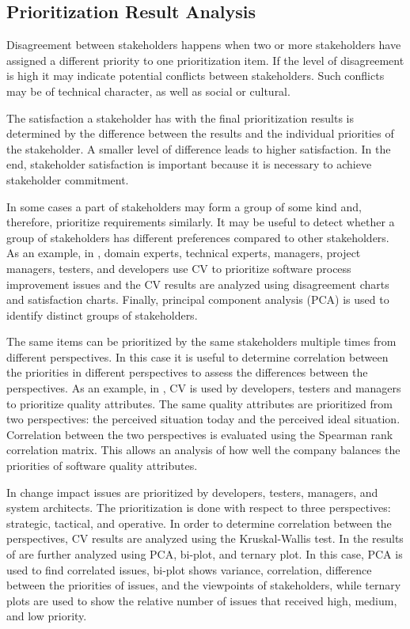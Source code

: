 \subsection{Prioritization Result Analysis}

Disagreement between stakeholders happens when two or more stakeholders have assigned
a different priority to one prioritization item. If the level of disagreement
is high it may indicate potential conflicts between stakeholders.
Such conflicts may be of technical character, as well as social or cultural.

The satisfaction a stakeholder has with the final prioritization results is
determined by the difference between the results and the individual priorities
of the stakeholder. A smaller level of difference leads to higher satisfaction.
In the end, stakeholder satisfaction is important because it is necessary to achieve
stakeholder commitment.

In some cases a part of stakeholders may form a group of some kind and, therefore, prioritize
requirements similarly. It may be useful
to detect whether a group of stakeholders has different preferences
compared to other stakeholders. As an example, in \cite{Pettersson2008}, domain experts,
technical experts, managers, project managers, testers, and developers
use CV to prioritize software process improvement issues and the CV results
are analyzed using disagreement charts and satisfaction charts.
Finally, principal component analysis (PCA) is used to identify distinct
groups of stakeholders.

The same items can be prioritized by the same stakeholders multiple times
from different perspectives. In this case it is useful to determine correlation between
the priorities in different perspectives to assess the differences
between the perspectives. As an example, in \cite{Barney2009b}, CV is used by developers,
testers and managers to prioritize quality attributes. The same quality
attributes are prioritized from two perspectives: the perceived situation
today and the perceived ideal situation. Correlation between the two perspectives
is evaluated using the Spearman rank correlation matrix. This allows an analysis of
how well the company balances the priorities of software quality attributes.

In \cite{Jonsson2005} change impact issues are prioritized by developers,
testers, managers, and system architects. The prioritization is done
with respect to three perspectives: strategic, tactical, and operative.
In order to determine correlation between the perspectives, CV results are
analyzed using the Kruskal-Wallis test. In \cite{Chatzipetrou2010} the
results of \cite{Jonsson2005} are further analyzed using PCA, bi-plot, and
ternary plot. In this case, PCA is used to find correlated issues, 
bi-plot shows variance, correlation, difference between
the priorities of issues, and the viewpoints of stakeholders, while ternary
plots are used to show the relative number of issues that received high,
medium, and low priority.


